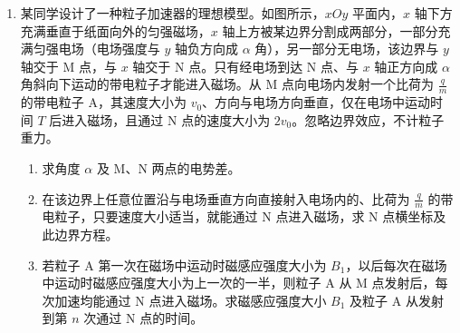 \documentclass[\gkver]{gaokaozhenti}
\begin{document}
\begin{enumerate}
{$\frac{1}{2}m(2v_{0})^{2}=\frac{1}{2}mv^{2}+\frac{1}{2}m'v^{2}$

联立解得
$v=v_{0}$，$m'=3m$

（3）设两球从第一次碰撞到第二次碰撞所用时间为 $\Delta t$，则
$t_{1}=\frac{\pi R}{2v_{0}}$

$v_{0}t_{2}+2v_{0}t_{2}=\pi R$

所以 $\Delta t=t_{1}+t_{2}=\frac{5\pi R}{6v_{0}}$
}

\item
某同学设计了一种粒子加速器的理想模型。如图所示，$xOy$ 平面内，$x$ 轴下方充满垂直于纸面向外的匀强磁场，$x$ 轴上方被某边界分割成两部分，一部分充满匀强电场（电场强度与 $y$ 轴负方向成 $\alpha$ 角），另一部分无电场，该边界与 $y$ 轴交于 M 点，与 $x$ 轴交于 N 点。只有经电场到达 N 点、与 $x$ 轴正方向成 $\alpha$ 角斜向下运动的带电粒子才能进入磁场。从 M 点向电场内发射一个比荷为 $\frac{q}{m}$ 的带电粒子 A，其速度大小为 $v_{0}$、方向与电场方向垂直，仅在电场中运动时间 $T$ 后进入磁场，且通过 N 点的速度大小为 $2v_{0}$。忽略边界效应，不计粒子重力。
\begin{enumerate}
	\item
	求角度 $\alpha$ 及 M、N 两点的电势差。
	\item
	在该边界上任意位置沿与电场垂直方向直接射入电场内的、比荷为 $\frac{q}{m}$ 的带电粒子，只要速度大小适当，就能通过 N 点进入磁场，求 N 点横坐标及此边界方程。
	\item
	若粒子 A 第一次在磁场中运动时磁感应强度大小为 $B_{1}$，以后每次在磁场中运动时磁感应强度大小为上一次的一半，则粒子 A 从 M 点发射后，每次加速均能通过 N 点进入磁场。求磁感应强度大小 $B_{1}$ 及粒子 A 从发射到第 $n$ 次通过 N 点的时间。
\end{enumerate}


\end{enumerate}
\end{document}

